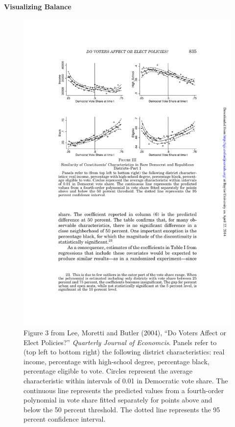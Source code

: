 \documentclass[notes=show]{beamer}
\begin{document}
\begin{frame}[shrink=20,plain]
	\begin{center}
	\textbf{Visualizing Balance}
	\end{center}
	
	\begin{figure}
	\includegraphics[scale=0.85]{./lecture_includes/lee_moretti_butler_fig3.pdf}
	\caption{\scriptsize Figure 3 from Lee, Moretti and Butler (2004), ``Do Voters Affect or Elect Policies?'' \emph{Quarterly Journal of Economcis}. Panels refer to (top left to bottom right) the following district characteristics: real income, percentage with high-school degree, percentage black, percentage eligible to vote. Circles represent the average characteristic within intervals of 0.01 in Democratic vote share. The continuous line represents the predicted values from a fourth-order polynomial in vote share fitted separately for points above and below the 50 percent threshold. The dotted line represents the 95 percent confidence interval.}
	\end{figure}
	
\end{frame}
\end{document}
